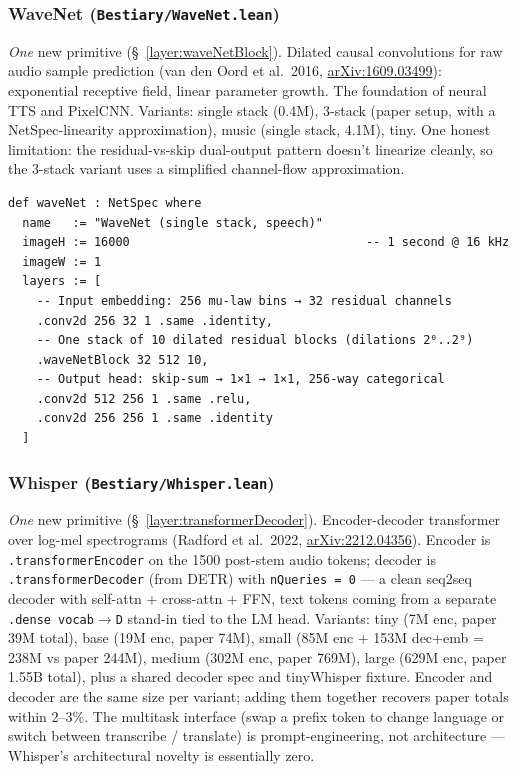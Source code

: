 \subsubsection*{WaveNet (\texttt{Bestiary/WaveNet.lean})}
\emph{One} new primitive (\S~\ref{layer:waveNetBlock}). Dilated causal
convolutions for raw audio sample prediction (van den Oord et al.\
2016, \href{https://arxiv.org/abs/1609.03499}{arXiv:1609.03499}): exponential receptive field, linear parameter
growth. The foundation of neural TTS and PixelCNN. Variants: single
stack (0.4M), 3-stack (paper setup, with a NetSpec-linearity
approximation), music (single stack, 4.1M), tiny. One honest
limitation: the residual-vs-skip dual-output pattern doesn't
linearize cleanly, so the 3-stack variant uses a simplified
channel-flow approximation.

\begin{verbatim}
def waveNet : NetSpec where
  name   := "WaveNet (single stack, speech)"
  imageH := 16000                                 -- 1 second @ 16 kHz
  imageW := 1
  layers := [
    -- Input embedding: 256 mu-law bins → 32 residual channels
    .conv2d 256 32 1 .same .identity,
    -- One stack of 10 dilated residual blocks (dilations 2⁰..2⁹)
    .waveNetBlock 32 512 10,
    -- Output head: skip-sum → 1×1 → 1×1, 256-way categorical
    .conv2d 512 256 1 .same .relu,
    .conv2d 256 256 1 .same .identity
  ]
\end{verbatim}

\subsubsection*{Whisper (\texttt{Bestiary/Whisper.lean})}
\emph{One} new primitive (\S~\ref{layer:transformerDecoder}). Encoder-decoder transformer over log-mel
spectrograms (Radford et al.\ 2022,
\href{https://arxiv.org/abs/2212.04356}{arXiv:2212.04356}). Encoder is
\texttt{.transformerEncoder} on the 1500 post-stem audio tokens;
decoder is \texttt{.transformerDecoder} (from DETR) with
\texttt{nQueries = 0} --- a clean seq2seq decoder with self-attn +
cross-attn + FFN, text tokens coming from a separate
\texttt{.dense vocab$\to$D} stand-in tied to the LM head. Variants:
tiny (7M enc, paper 39M total), base (19M enc, paper 74M), small
(85M enc + 153M dec+emb = 238M vs paper 244M), medium (302M enc,
paper 769M), large (629M enc, paper 1.55B total), plus a shared
decoder spec and tinyWhisper fixture. Encoder and decoder are the
same size per variant; adding them together recovers paper totals
within 2--3\%. The multitask interface (swap a prefix token to change
language or switch between transcribe / translate) is
prompt-engineering, not architecture --- Whisper's architectural
novelty is essentially zero.

